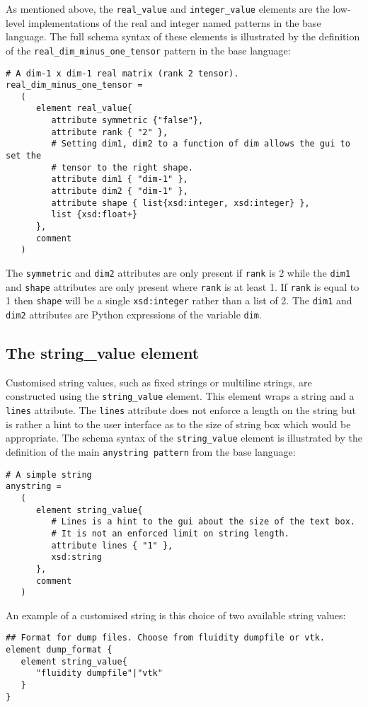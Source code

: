 \documentclass[a4paper, 11pt]{book}
\begin{document}
As mentioned above, the \verb+real_value+ and \verb+integer_value+
elements are the low-level implementations of the real and integer named
patterns in the base language. The full schema syntax of these elements is
illustrated by the definition of the \verb+real_dim_minus_one_tensor+
pattern in the base language:
\begin{lstlisting}
# A dim-1 x dim-1 real matrix (rank 2 tensor).
real_dim_minus_one_tensor =
   (
      element real_value{
         attribute symmetric {"false"},
         attribute rank { "2" },
         # Setting dim1, dim2 to a function of dim allows the gui to set the
         # tensor to the right shape.
         attribute dim1 { "dim-1" },
         attribute dim2 { "dim-1" },
         attribute shape { list{xsd:integer, xsd:integer} },
         list {xsd:float+}
      },
      comment
   )
\end{lstlisting}
The \lstinline+symmetric+ and \lstinline+dim2+ attributes are only present
if \lstinline+rank+ is 2 while the \lstinline+dim1+ and \lstinline+shape+
attributes are only present where \lstinline+rank+ is at least 1. If
\lstinline+rank+ is equal to 1 then \lstinline+shape+ will be a single
\lstinline+xsd:integer+ rather than a list of 2. The \lstinline+dim1+ and
\lstinline+dim2+ attributes are Python expressions of the variable
\lstinline+dim+.


\subsection{The string\_value element}

Customised string values, such as fixed strings or multiline strings, are
constructed using the \lstinline+string_value+ element. This element wraps a
string and a \lstinline+lines+ attribute. The \lstinline+lines+ attribute
does not enforce a length on the string but is rather a hint to the user
interface as to the size of string box which would be appropriate. The
schema syntax of the \lstinline+string_value+ element is illustrated by the
definition of the main \lstinline+anystring pattern+ from the base language:
\begin{lstlisting}
# A simple string
anystring =
   (
      element string_value{
         # Lines is a hint to the gui about the size of the text box.
         # It is not an enforced limit on string length.
         attribute lines { "1" },
         xsd:string
      },
      comment
   )
\end{lstlisting}
An example of a customised string is this choice of two available string
values:
\begin{lstlisting}
## Format for dump files. Choose from fluidity dumpfile or vtk.
element dump_format {
   element string_value{
      "fluidity dumpfile"|"vtk"
   }
}
\end{lstlisting}
\end{document}
